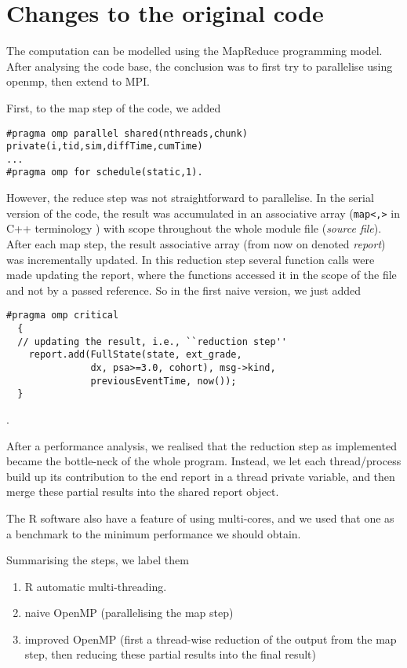 
\section{Changes to the original code}
The computation can be modelled using the MapReduce programming model. After
analysing the code base, the conclusion was to first try to
parallelise using openmp, then extend to MPI.

First, to the map step of the code, we added
\begin{lstlisting}
#pragma omp parallel shared(nthreads,chunk) private(i,tid,sim,diffTime,cumTime)
...
#pragma omp for schedule(static,1).
\end{lstlisting}
However, the reduce step was not straightforward to parallelise. In
the serial version of the code, the result was accumulated in an
associative array (\texttt{map<,>} in C++ terminology ) with scope
throughout the whole module file (\emph{source file}). After each map
step, the result associative array (from now on denoted \emph{report})
was incrementally updated. In this reduction step several function
calls were made updating the report, where the functions
accessed it in the scope of the file and not by a passed reference. So
in the first naive version, we just added \lstset{language=C++}
\begin{lstlisting}
#pragma omp critical
  {
  // updating the result, i.e., ``reduction step''
    report.add(FullState(state, ext_grade,
               dx, psa>=3.0, cohort), msg->kind,
               previousEventTime, now());
  }
\end{lstlisting}.

After a performance analysis, we realised that the reduction step as
implemented became the bottle-neck of the whole program. Instead, we
let each thread/process build up its contribution to the end report in
a thread private variable, and then merge these partial results into the
shared report object.

The R software also have a feature of using multi-cores, and we used
that one as a benchmark to the minimum performance we should obtain.

Summarising the steps, we label them
\begin{enumerate}
\item R automatic multi-threading.
\item naive OpenMP (parallelising the map step)
\item improved OpenMP (first a thread-wise reduction of the output
  from the map step, then
  reducing these partial results into the final result)
\end{enumerate}


